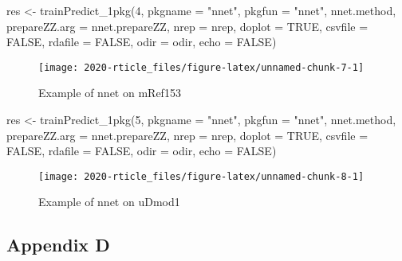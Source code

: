 \begin{Schunk}
\begin{Sinput}
res <- trainPredict_1pkg(4, pkgname = "nnet", pkgfun = "nnet", nnet.method,
  prepareZZ.arg = nnet.prepareZZ, nrep = nrep, doplot = TRUE,
  csvfile = FALSE, rdafile = FALSE, odir = odir, echo = FALSE)
\end{Sinput}
\begin{figure}

{\centering \texttt{[image: 2020-rticle\_files/figure-latex/unnamed-chunk-7-1]} 

}

\caption[Example of nnet on mRef153]{Example of nnet on mRef153}\label{fig:unnamed-chunk-7}
\end{figure}
\end{Schunk}

\begin{Schunk}
\begin{Sinput}
res <- trainPredict_1pkg(5, pkgname = "nnet", pkgfun = "nnet", nnet.method,
  prepareZZ.arg = nnet.prepareZZ, nrep = nrep, doplot = TRUE,
  csvfile = FALSE, rdafile = FALSE, odir = odir, echo = FALSE)
\end{Sinput}
\begin{figure}

{\centering \texttt{[image: 2020-rticle\_files/figure-latex/unnamed-chunk-8-1]} 

}

\caption[Example of nnet on uDmod1]{Example of nnet on uDmod1}\label{fig:unnamed-chunk-8}
\end{figure}
\end{Schunk}

\hypertarget{appendix-d}{%
\subsection{Appendix D}\label{appendix-d}}

